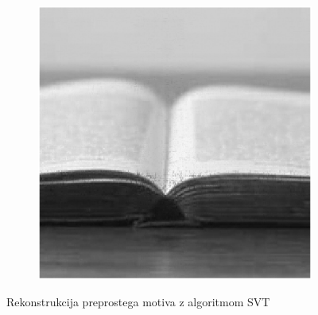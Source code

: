 \begin{figure}
\begin{subfigure}{0.325\linewidth}
    \end{subfigure}
    \hfill
    \begin{subfigure}{0.325\linewidth}
        \includegraphics[width=\linewidth]{Poglavja/Slike/kompleksnost/preprosta grayscale 300/rez60SVT.png}
    \end{subfigure}
    \caption{Rekonstrukcija preprostega motiva z algoritmom SVT}
\end{figure}
    
